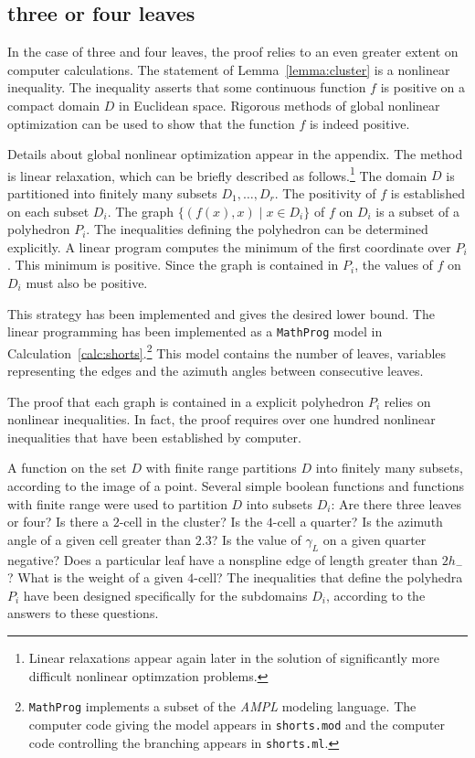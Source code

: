 \subsection{three or four leaves}\label{sec:3or4}

In the case of three and four leaves, the proof relies to an even
greater extent on computer calculations.  The statement of
Lemma~\ref{lemma:cluster} is a nonlinear inequality.  The inequality
asserts that some continuous function $f$ is positive on a compact
domain $D$ in Euclidean space.  Rigorous methods of global nonlinear
optimization can be used to show that the function $f$ is indeed
positive.

Details about global nonlinear optimization appear in the appendix.
The method is linear relaxation, which can be briefly described as
follows.\footnote{Linear relaxations appear again later in the
solution of significantly more difficult nonlinear optimzation
problems.}  The domain $D$ is partitioned into finitely many subsets
$D_1,\ldots, D_r$.  The positivity of $f$ is established on each
subset $D_i$.  The graph $\{(f(x), x)\mid x\in D_i\}$ of $f$ on $D_i$
is a subset of a polyhedron $P_i$.  The inequalities defining the
polyhedron can be determined explicitly.  A linear program computes
the minimum of the first coordinate over $P_i$.  This minimum is
positive.  Since the graph is contained in $P_i$, the values of $f$ on
$D_i$ must also be positive.

This strategy has been implemented and gives the desired lower bound.
The linear programming has been implemented as a {\tt MathProg} model
in Calculation~\ref{calc:shorts}.\footnote{{\tt MathProg} implements a
subset of the {\it AMPL} modeling language.  The computer code
giving the model appears in {\tt shorts.mod} and the computer code
controlling the branching appears in {\tt shorts.ml}.}  This model
contains the number of leaves, variables representing the edges and
the azimuth angles between consecutive leaves.

The proof that each graph is contained in a explicit polyhedron $P_i$
relies on nonlinear inequalities.  In fact, the proof requires over
one hundred nonlinear inequalities that have been established by
computer.

A function on the set $D$ with finite range partitions $D$ into
finitely many subsets, according to the image of a point.  Several
simple boolean functions and functions with finite range were used to
partition $D$ into subsets $D_i$: Are there three leaves or four?  Is
there a $2$-cell in the cluster?  Is the $4$-cell a quarter?  Is the
azimuth angle of a given cell greater than $2.3$?  Is the value of
$\gamma_L$ on a given quarter negative? Does a particular leaf have a
nonspline edge of length greater than $2h_-$?  What is the weight of a
given $4$-cell?  The inequalities that define the polyhedra $P_i$ have
been designed specifically for the subdomains $D_i$, according to the
answers to these questions.

